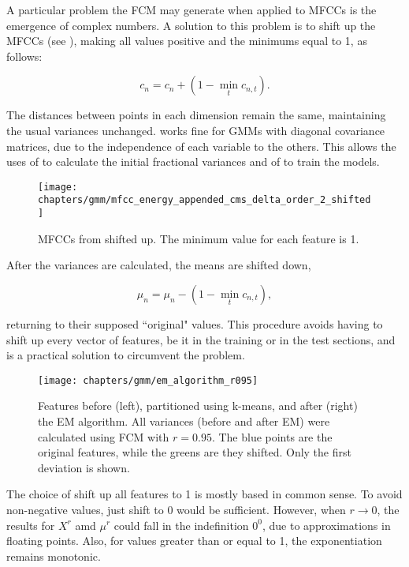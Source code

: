 \noindent A particular problem the FCM may generate when applied to MFCCs is the emergence of complex numbers. A solution to this problem is to shift up the MFCCs (see ), making all values positive and the minimums equal to 1, as follows:

\begin{equation}
    c_n = c_n + (1 - \min_t c_{n,t}).
    \label{eq:mfccs-shift-up}
\end{equation}

\noindent The distances between points in each dimension remain the same, maintaining the usual variances unchanged.  works fine for GMMs with diagonal covariance matrices, due to the independence of each variable to the others. This allows the uses of  to calculate the initial fractional variances and of  to train the models.

\begin{figure}[ht]
    \centering
    \texttt{[image: chapters/gmm/mfcc\_energy\_appended\_cms\_delta\_order\_2\_shifted]}
    \caption{MFCCs from  shifted up. The minimum value for each feature is 1.}
    \label{fig:mfcc-shifted}
\end{figure}

\noindent After the variances are calculated, the means are shifted down,

\begin{equation}
    \mu_n = \mu_n - (1 - \min_t c_{n,t}),
    \label{eq:means-shift-down}
\end{equation}

\noindent returning to their supposed ``original" values. This procedure avoids having to shift up every vector of features, be it in the training or in the test sections, and is a practical solution to circumvent the problem.

\begin{figure}[ht]
    \centering
    \texttt{[image: chapters/gmm/em\_algorithm\_r095]}
    \caption{Features before (left), partitioned using k-means, and after (right) the EM algorithm. All variances (before and after EM) were calculated using FCM with $r = 0.95$. The blue points are the original features, while the greens are they shifted. Only the first deviation is shown.}
    \label{fig:frac-em_algorithm}
\end{figure}

The choice of shift up all features to 1 is mostly based in common sense. To avoid non-negative values, just shift to 0 would be sufficient. However, when $r \to 0$, the results for $X^r$ amd $\mu^r$ could fall in the indefinition $0^0$, due to approximations in floating points. Also, for values greater than or equal to 1, the exponentiation remains monotonic.